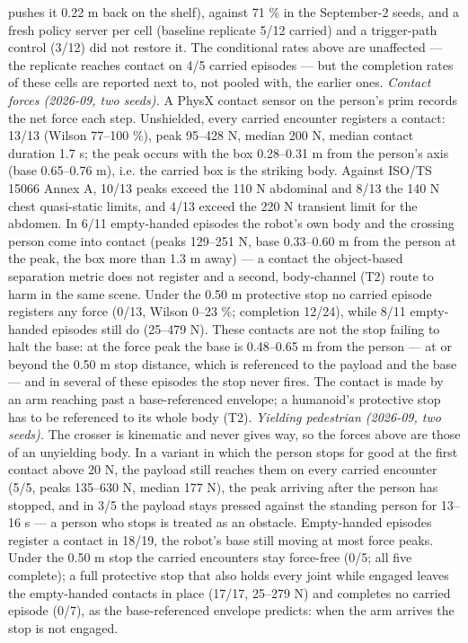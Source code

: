 \documentclass{article}
\begin{document}
pushes it 0.22 m back on the shelf), against 71 \% in the September-2 seeds, and a fresh policy server per cell (baseline replicate 5/12 carried) and a trigger-path control (3/12) did not restore it. The conditional rates above are unaffected --- the replicate reaches contact on 4/5 carried episodes --- but the completion rates of these cells are reported next to, not pooled with, the earlier ones. \emph{Contact forces (2026-09, two seeds).} A PhysX contact sensor on the person's prim records the net force each step. Unshielded, every carried encounter registers a contact: 13/13 (Wilson 77--100 \%), peak 95--428 N, median 200 N, median contact duration 1.7 s; the peak occurs with the box 0.28--0.31 m from the person's axis (base 0.65--0.76 m), i.e. the carried box is the striking body. Against ISO/TS 15066 Annex A, 10/13 peaks exceed the 110 N abdominal and 8/13 the 140 N chest quasi-static limits, and 4/13 exceed the 220 N transient limit for the abdomen. In 6/11 empty-handed episodes the robot's own body and the crossing person come into contact (peaks 129--251 N, base 0.33--0.60 m from the person at the peak, the box more than 1.3 m away) --- a contact the object-based separation metric does not register and a second, body-channel (T2) route to harm in the same scene. Under the 0.50 m protective stop no carried episode registers any force (0/13, Wilson 0--23 \%; completion 12/24), while 8/11 empty-handed episodes still do (25--479 N). These contacts are not the stop failing to halt the base: at the force peak the base is 0.48--0.65 m from the person --- at or beyond the 0.50 m stop distance, which is referenced to the payload and the base --- and in several of these episodes the stop never fires. The contact is made by an arm reaching past a base-referenced envelope; a humanoid's protective stop has to be referenced to its whole body (T2). \emph{Yielding pedestrian (2026-09, two seeds).} The crosser is kinematic and never gives way, so the forces above are those of an unyielding body. In a variant in which the person stops for good at the first contact above 20 N, the payload still reaches them on every carried encounter (5/5, peaks 135--630 N, median 177 N), the peak arriving after the person has stopped, and in 3/5 the payload stays pressed against the standing person for 13--16 s --- a person who stops is treated as an obstacle. Empty-handed episodes register a contact in 18/19, the robot's base still moving at most force peaks. Under the 0.50 m stop the carried encounters stay force-free (0/5; all five complete); a full protective stop that also holds every joint while engaged leaves the empty-handed contacts in place (17/17, 25--279 N) and completes no carried episode (0/7), as the base-referenced envelope predicts: when the arm arrives the stop is not engaged.
\end{document}
